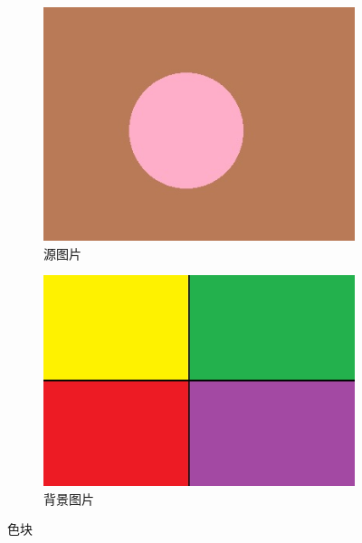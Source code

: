 \documentclass[11pt,a4paper]{article}
\begin{document}
		\begin{figure}[ht]
			\centering
			\begin{subfigure}[htbp]{0.45\textwidth}
				\includegraphics[width=\textwidth]{../../data/test_src.jpg}
				\caption{源图片}
			\end{subfigure}
			\begin{subfigure}[htbp]{0.45\textwidth}
				\includegraphics[width=\textwidth]{../../data/test_target.jpg}
				\caption{背景图片}
			\end{subfigure}
			\caption{色块}
		\end{figure}
\end{document}

